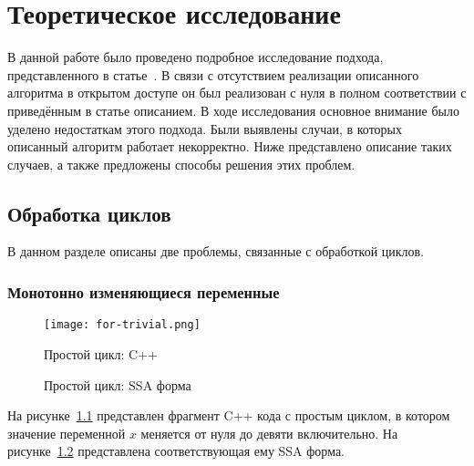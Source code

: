 \chapter{Теоретическое исследование}

В данной работе было проведено подробное исследование подхода,
представленного в статье~\cite{li2010practical}. В связи с отсутствием
реализации описанного алгоритма в открытом доступе он был реализован с
нуля в полном соответствии с приведённым в статье описанием. В ходе
исследования основное внимание было уделено недостаткам этого
подхода. Были выявлены случаи, в которых описанный алгоритм работает
некорректно. Ниже представлено описание таких случаев, а также
предложены способы решения этих проблем.

\section{Обработка циклов}

В данном разделе описаны две проблемы, связанные с обработкой
циклов.

\subsection{Монотонно изменяющиеся переменные}

\begin{figure}
    \texttt{[image: for-trivial.png]}
    \caption{Простой цикл: C++}
    \label{fig:for-trivial-cpp}
\end{figure}

\begin{figure}
    \caption{Простой цикл: SSA форма}
    \label{fig:for-trivial-ssa}
\end{figure}

На рисунке~\ref{fig:for-trivial-cpp} представлен фрагмент C++ кода с
простым циклом, в котором значение переменной $x$ меняется от нуля до
девяти включительно. На рисунке~\ref{fig:for-trivial-ssa} представлена
соответствующая ему SSA форма.

